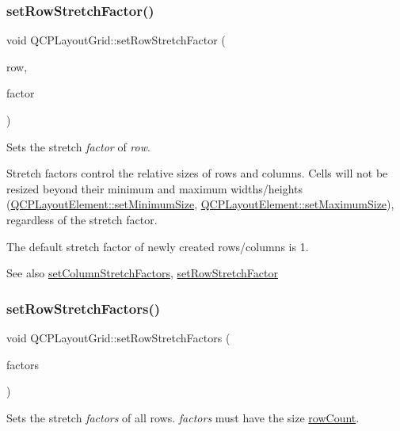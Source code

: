 \subsubsection{\texorpdfstring{set\+Row\+Stretch\+Factor()}{setRowStretchFactor()}}
{\footnotesize\ttfamily void Q\+C\+P\+Layout\+Grid\+::set\+Row\+Stretch\+Factor (\begin{DoxyParamCaption}\item[{int}]{row,  }\item[{double}]{factor }\end{DoxyParamCaption})}

Sets the stretch {\itshape factor} of {\itshape row}.

Stretch factors control the relative sizes of rows and columns. Cells will not be resized beyond their minimum and maximum widths/heights (\hyperlink{class_q_c_p_layout_element_a5dd29a3c8bc88440c97c06b67be7886b}{Q\+C\+P\+Layout\+Element\+::set\+Minimum\+Size}, \hyperlink{class_q_c_p_layout_element_a74eb5280a737ab44833d506db65efd95}{Q\+C\+P\+Layout\+Element\+::set\+Maximum\+Size}), regardless of the stretch factor.

The default stretch factor of newly created rows/columns is 1.

\begin{DoxySeeAlso}{See also}
\hyperlink{class_q_c_p_layout_grid_a6c2591d1a7e2534ce036989543b49e57}{set\+Column\+Stretch\+Factors}, \hyperlink{class_q_c_p_layout_grid_a7b0273de5369bd93d942edbaf5b166ec}{set\+Row\+Stretch\+Factor} 
\end{DoxySeeAlso}
\mbox{\label{class_q_c_p_layout_grid_a200b45f9c908f96ebadaa3c8d87a2782}} 
\subsubsection{\texorpdfstring{set\+Row\+Stretch\+Factors()}{setRowStretchFactors()}}
{\footnotesize\ttfamily void Q\+C\+P\+Layout\+Grid\+::set\+Row\+Stretch\+Factors (\begin{DoxyParamCaption}\item[{const \hyperlink{class_q_list}{Q\+List}$<$ double $>$ \&}]{factors }\end{DoxyParamCaption})}

Sets the stretch {\itshape factors} of all rows. {\itshape factors} must have the size \hyperlink{class_q_c_p_layout_grid_a19c66fd76cbce58a8e94f33797e0c0aa}{row\+Count}.

